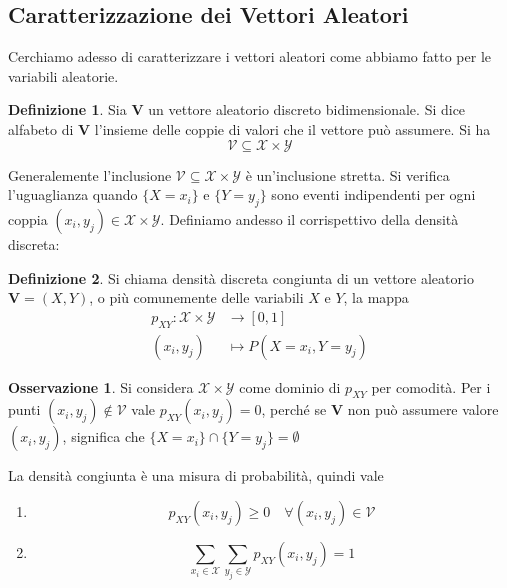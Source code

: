 \documentclass{article}
\theoremstyle{plain}
\theoremstyle{definition}
\newtheorem{definizione}{Definizione}[section]
\newtheorem{osservazione}{Osservazione}[section]
\theoremstyle{remark}
\begin{document}
\subsection{Caratterizzazione dei Vettori Aleatori} %
\label{sub:caratterizzazione_dei_vettori_aleatori}
Cerchiamo adesso di caratterizzare i vettori aleatori come abbiamo fatto per le variabili aleatorie.
\begin{definizione}
	Sia $\bm{V}$ un vettore aleatorio discreto bidimensionale. Si dice alfabeto di $\bm{V}$ l'insieme delle coppie di valori che il vettore può assumere. Si ha
	\begin{equation*}
		\mathcal{V}\subseteq\mathcal{X}\times\mathcal{Y}
	\end{equation*}
\end{definizione}
Generalemente l'inclusione $\mathcal{V}\subseteq\mathcal{X}\times\mathcal{Y}$ è un'inclusione stretta. Si verifica l'uguaglianza quando $\{X=x_i\}$ e $\{Y=y_j\}$ sono eventi indipendenti per ogni coppia $(x_i,y_j)\in\mathcal{X}\times\mathcal{Y}$. Definiamo andesso il corrispettivo della densità discreta:
\begin{definizione}
	Si chiama densità discreta congiunta di un vettore aleatorio $\bm{V}=(X,Y)$, o più comunemente delle variabili $X$ e $Y$, la mappa
	\begin{align*}
		p_{XY}:\mathcal{X}\times\mathcal{Y}&\to[0,1]\\
		(x_i,y_j)&\mapsto P(X=x_i,Y=y_j)
	\end{align*}
\end{definizione}
\begin{osservazione}
	Si considera $\mathcal{X}\times\mathcal{Y}$ come dominio di $p_{XY}$ per comodità. Per i punti $(x_i,y_j)\notin\mathcal{V}$ vale $p_{XY}(x_i,y_j)=0$, perché se $\bm{V}$ non può assumere valore $(x_i,y_j)$, significa che $\{X=x_i\}\cap\{Y=y_j\}=\emptyset$
\end{osservazione}
La densità congiunta è una misura di probabilità, quindi vale
\begin{enumerate}
	\item
	\begin{equation*}
		p_{XY}(x_i , y_j)\geq0\quad\forall(x_i , y_j)\in\mathcal{V}
	\end{equation*}
	\item 
	\begin{equation*}
		\sum_{x_i\in\mathcal{X}}\sum_{y_j\in\mathcal{Y}}p_{XY}(x_i,y_j)=1
	\end{equation*}
\end{enumerate}
\end{document}
